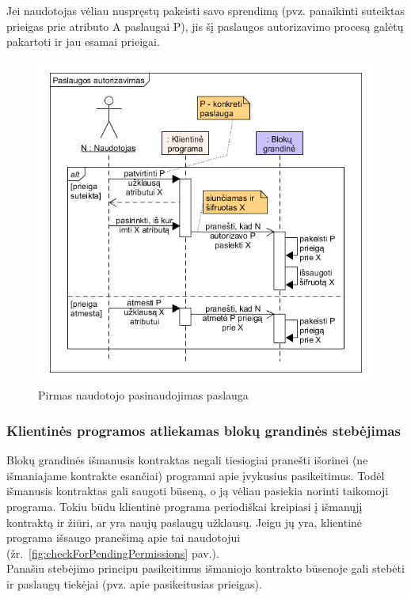 Jei naudotojas vėliau nuspręstų pakeisti savo sprendimą (pvz. panaikinti suteiktas prieigas prie atributo A paslaugai P),
jis šį paslaugos autorizavimo procesą galėtų pakartoti ir jau esamai prieigai.


\begin{figure}[h]
    \centering
    \includegraphics[scale=0.65]{img/givePermissions}
    \caption{Pirmas naudotojo pasinaudojimas paslauga}
    \label{fig:givePermissions}
\end{figure}

\subsubsection{Klientinės programos atliekamas blokų grandinės stebėjimas} \label{BCIDM:blockchainMonitoring}

Blokų grandinės išmanusis kontraktas negali tiesiogiai pranešti išorinei (ne išmaniajame kontrakte esančiai) programai
apie įvykusius pasikeitimus. Todėl išmanusis kontraktas gali saugoti būseną, o ją vėliau pasiekia norinti taikomoji programa.
Tokiu būdu klientinė programa periodiškai kreipiasi į išmanųjį kontraktą ir žiūri, ar yra naujų paslaugų užklausų. Jeigu jų yra,
klientinė programa išsaugo pranešimą apie tai naudotojui (žr.~\ref{fig:checkForPendingPermissions} pav.).\\
Panašiu stebėjimo principu pasikeitimus išmaniojo kontrakto būsenoje gali stebėti ir paslaugų tiekėjai
(pvz. apie pasikeitusias prieigas).

